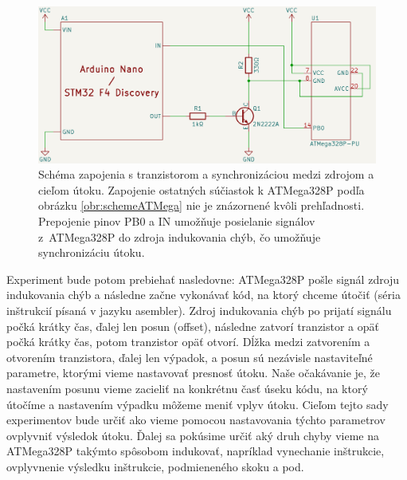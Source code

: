 \begin{figure}
    \centerline{\includegraphics[width=1\textwidth]{images/schemeExpTranz.png}}
    \caption[Schéma zapojenia s tranzistorom a synchronizáciou]{Schéma zapojenia s tranzistorom a synchronizáciou medzi zdrojom a cieľom útoku. Zapojenie ostatných súčiastok k ATMega328P podľa obrázku \ref{obr:schemeATMega} nie je znázornené kvôli prehľadnosti. Prepojenie pinov PB0 a IN umožňuje posielanie signálov z~ATMega328P do zdroja indukovania chýb, čo umožňuje synchronizáciu útoku.}
    \label{obr:schemeExpTranz}
\end{figure}

Experiment bude potom prebiehať nasledovne: ATMega328P pošle signál zdroju indukovania chýb a následne začne vykonávať kód, na ktorý chceme útočiť (séria inštrukcií písaná v jazyku asembler). Zdroj indukovania chýb po prijatí signálu počká krátky čas, ďalej len posun (offset), následne zatvorí tranzistor a opäť počká krátky čas, potom tranzistor opäť otvorí. Dĺžka medzi zatvorením a otvorením tranzistora, ďalej len výpadok, a posun sú nezávisle nastaviteľné parametre, ktorými vieme nastavovať presnosť útoku. Naše očakávanie je, že nastavením posunu vieme zacieliť na konkrétnu časť úseku kódu, na ktorý útočíme a nastavením výpadku môžeme meniť vplyv útoku. Cieľom tejto sady experimentov bude určiť ako vieme pomocou nastavovania týchto parametrov ovplyvniť výsledok útoku. Ďalej sa pokúsime určiť aký druh chyby vieme na ATMega328P takýmto spôsobom indukovať, napríklad vynechanie inštrukcie, ovplyvnenie výsledku inštrukcie, podmieneného skoku a pod.

